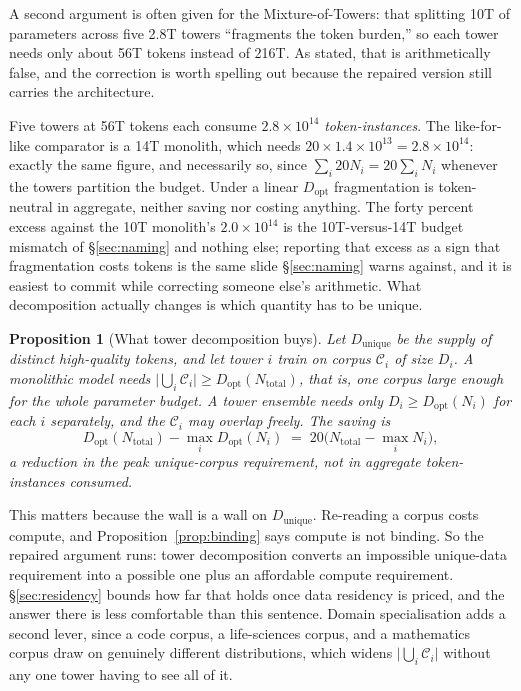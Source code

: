 \documentclass[11pt]{article}
\newtheorem{proposition}{Proposition}
\begin{document}
A second argument is often given for the Mixture-of-Towers: that splitting 10T of parameters across five 2.8T towers ``fragments the token burden,'' so each tower needs only about 56T tokens instead of 216T. As stated, that is arithmetically false, and the correction is worth spelling out because the repaired version still carries the architecture.

Five towers at 56T tokens each consume $2.8\times10^{14}$ \emph{token-instances}. The like-for-like comparator is a 14T monolith, which needs $20 \times 1.4\times10^{13} = 2.8\times10^{14}$: exactly the same figure, and necessarily so, since $\sum_i 20 N_i = 20 \sum_i N_i$ whenever the towers partition the budget. Under a linear $D_{\mathrm{opt}}$ fragmentation is token-neutral in aggregate, neither saving nor costing anything. The forty percent excess against the 10T monolith's $2.0\times10^{14}$ is the 10T-versus-14T budget mismatch of \S\ref{sec:naming} and nothing else; reporting that excess as a sign that fragmentation costs tokens is the same slide \S\ref{sec:naming} warns against, and it is easiest to commit while correcting someone else's arithmetic. What decomposition actually changes is which quantity has to be unique.

\begin{proposition}[What tower decomposition buys]
\label{prop:tokens}
Let $D_{\mathrm{unique}}$ be the supply of distinct high-quality tokens, and let tower $i$ train on corpus $\mathcal{C}_i$ of size $D_i$. A monolithic model needs $\bigl|\bigcup_i \mathcal{C}_i\bigr| \geq D_{\mathrm{opt}}(N_{\mathrm{total}})$, that is, one corpus large enough for the whole parameter budget. A tower ensemble needs only $D_i \geq D_{\mathrm{opt}}(N_i)$ for each $i$ separately, and the $\mathcal{C}_i$ may overlap freely. The saving is
\[
D_{\mathrm{opt}}(N_{\mathrm{total}}) - \max_i D_{\mathrm{opt}}(N_i) \;=\; 20\bigl(N_{\mathrm{total}} - \max_i N_i\bigr),
\]
a reduction in the \emph{peak unique-corpus} requirement, not in aggregate token-instances consumed.
\end{proposition}

This matters because the wall is a wall on $D_{\mathrm{unique}}$. Re-reading a corpus costs compute, and Proposition~\ref{prop:binding} says compute is not binding. So the repaired argument runs: tower decomposition converts an impossible unique-data requirement into a possible one plus an affordable compute requirement. \S\ref{sec:residency} bounds how far that holds once data residency is priced, and the answer there is less comfortable than this sentence. Domain specialisation adds a second lever, since a code corpus, a life-sciences corpus, and a mathematics corpus draw on genuinely different distributions, which widens $\bigl|\bigcup_i \mathcal{C}_i\bigr|$ without any one tower having to see all of it.
\end{document}
